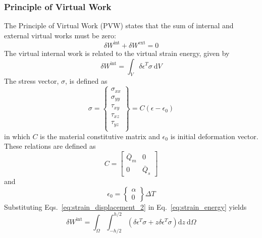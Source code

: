 \documentclass[12pt]{article}
\numberwithin{equation}{section}
\begin{document}
\subsubsection{Principle of Virtual Work}
The Principle of Virtual Work (PVW) states that the sum of internal and external virtual works must be zero:
%
\begin{equation}
    \delta W^{\text{int}} + \delta W^{\text{ext}} = 0
    \label{eq:pvw_1}
\end{equation}
%
The virtual internal work is related to the virtual strain energy, given by
%
\begin{equation}
    \delta W^{\text{int}} = \int_V \delta \epsilon^T \sigma ~ \text{d}V
    \label{eq:strain_energy}
\end{equation}
The stress vector, \(\sigma\), is defined as
%
\begin{equation}
    \sigma =
    \begin{Bmatrix}
        \sigma_{xx} \\
        \sigma_{yy} \\
        \tau_{xy}   \\
        \tau_{xz}   \\
        \tau_{yz}   \\
    \end{Bmatrix}
    =
    C \left( \epsilon  - \epsilon_0 \right)
    \label{eq:stress_vector}
\end{equation}
%
in which \( C \) is the material constitutive matrix and \( \epsilon_0 \) is initial deformation vector. These relations are defined as
%
\begin{equation}
    C =
    \begin{bmatrix}
        \bar{Q}_m & 0         \\
        0         & \bar{Q}_s
    \end{bmatrix}
\end{equation}
%
and
%
\begin{equation}
    \epsilon_0 =
    \begin{Bmatrix}
        \alpha \\
        0
    \end{Bmatrix} \Delta T
\end{equation}
%
Substituting Eqs.~\eqref{eq:strain_displacement_2} in Eq.~\eqref{eq:strain_energy} yields
%
\begin{equation}
    \delta W^{\text{int}} = \int_\Omega \int_{-h/2}^{h/2}
    \left(
    \delta \epsilon^T \sigma +
    z \delta \epsilon^T \sigma
    \right)
    \text{d}z ~ \text{d}\Omega
    \label{eq:strain_energy_2}
\end{equation}
\end{document}
